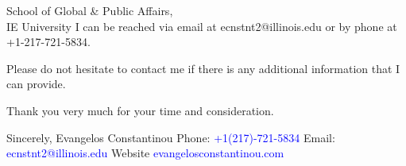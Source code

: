 \documentclass[12pt]{letter}
\begin{document}
\begin{letter}{School of Global \& Public Affairs,\\
IE University}
I can be reached via email at ecnstnt2@illinois.edu or by phone at +1-217-721-5834.

Please do not hesitate to contact me if there is any additional information that I can provide.

Thank you very much for your time and consideration.


\noindent Sincerely,
\newline\noindent Evangelos Constantinou
\vspace{4mm}
\newline\noindent Phone: \textcolor{blue}{+1(217)-721-5834}
\newline\noindent Email: \textcolor{blue}{ecnstnt2@illinois.edu}
\newline\noindent Website \textcolor{blue}{evangelosconstantinou.com}
\end{letter}
\end{document}
